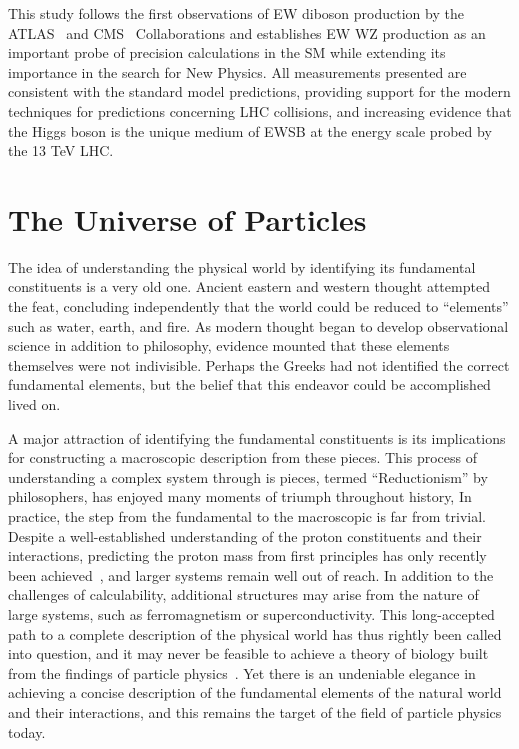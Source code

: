 This study follows the first observations of EW diboson production
by the ATLAS~\cite{ATLAS-CONF-2018-030,ATLAS-CONF-2018-033} and CMS~\cite{Sirunyan:2017ret} Collaborations
and establishes EW WZ production as an important
probe of precision calculations in the SM while extending its importance 
in the search for New Physics.
All measurements presented are consistent with the standard model predictions,
providing support for the modern techniques for predictions concerning LHC collisions, and 
increasing evidence that the Higgs boson is the unique medium of EWSB 
at the energy scale probed by the 13 TeV LHC.

\section{The Universe of Particles}

The idea of understanding the physical world by identifying its
fundamental constituents is a very old one. Ancient eastern and
western thought attempted the feat, concluding
independently that the world could be reduced 
to ``elements'' such as water, earth, and fire.
As modern thought began to develop observational science in addition
to philosophy, evidence mounted that these elements themselves were 
not indivisible. Perhaps the Greeks had not identified
the correct fundamental elements, but the belief that this endeavor could
be accomplished lived on.

A major attraction of identifying the fundamental constituents 
is its implications for constructing a macroscopic description from these
pieces. This process of understanding a complex system through is pieces, 
termed ``Reductionism'' by philosophers, has enjoyed
many moments of triumph throughout history, 
In practice, the step from the fundamental to the macroscopic 
is far from trivial. Despite a well-established
understanding of the proton constituents and their interactions,
predicting the proton mass from first principles has only recently 
been achieved~\cite{Durr:2008zz}, and larger systems remain well
out of reach.
In addition to the challenges of calculability, additional structures
may arise from the nature of large systems, such as ferromagnetism or 
superconductivity.
This long-accepted path to a complete description of the physical world
has thus rightly been called into question, and it may never be feasible
to achieve a theory of biology built from the findings of particle 
physics~\cite{Anderson393}.
Yet there is an undeniable elegance in achieving a concise description
of the fundamental elements of the natural world and their interactions,
and this remains the target of the field of particle physics today. 

